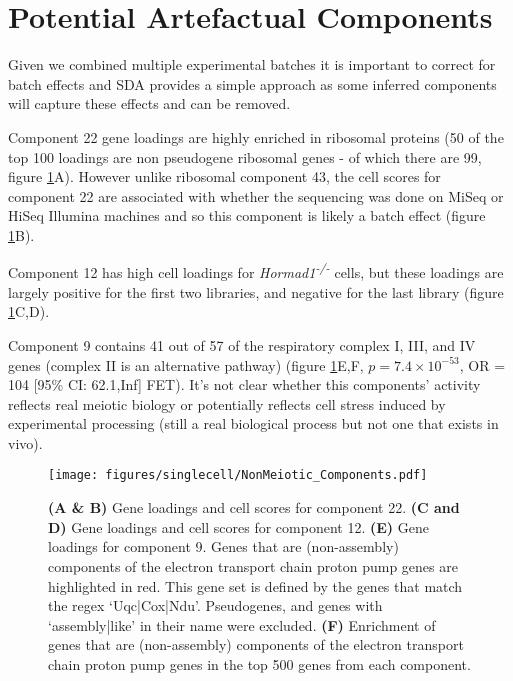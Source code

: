 \newpage
\section{Potential Artefactual Components}

Given we combined multiple experimental batches it is important to correct for batch effects and SDA provides a simple approach as some inferred components will capture these effects and can be removed.

Component 22 gene loadings are highly enriched in ribosomal proteins (50 of the top 100 loadings are non pseudogene ribosomal genes - of which there are 99, figure \ref{fig:NonMeiotic}A). However unlike ribosomal component 43, the cell scores for component 22 are associated with whether the sequencing was done on MiSeq or HiSeq Illumina machines and so this component is likely a batch effect (figure \ref{fig:NonMeiotic}B).

Component 12 has high cell loadings for \textit{Hormad1\textsuperscript{-/-}} cells, but these loadings are largely positive for the first two libraries, and negative for the last library (figure \ref{fig:NonMeiotic}C,D).

Component 9 contains 41 out of 57 of the respiratory complex I, III, and IV genes (complex II is an alternative pathway) (figure \ref{fig:NonMeiotic}E,F, $p = 7.4\times10^{-53}$, OR = 104 [95\% CI: 62.1,Inf] FET). It's not clear whether this components' activity reflects real meiotic biology or potentially reflects cell stress induced by experimental processing (still a real biological process but not one that exists in vivo).

\begin{figure}[H]
	\centering
	\texttt{[image: figures/singlecell/NonMeiotic\_Components.pdf]}
	\caption[Non Meiotic Components]{
		\textbf{(A \& B)} Gene loadings and cell scores for component 22.
		\textbf{(C and D)} Gene loadings and cell scores for component 12.
		\textbf{(E)} Gene loadings for component 9. Genes that are (non-assembly) components of the electron transport chain proton pump genes are highlighted in red. This gene set is defined by the genes that match the regex ‘Uqc|Cox|Ndu’. Pseudogenes, and genes with ‘assembly|like’ in their name were excluded.
		\textbf{(F)} Enrichment of genes that are (non-assembly) components of the electron transport chain proton pump genes in the top 500 genes from each component.
	}
	\label{fig:NonMeiotic}
\end{figure}


